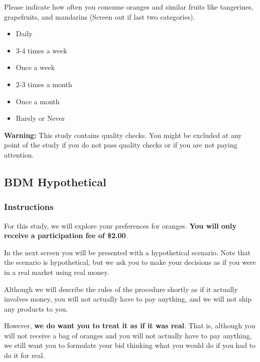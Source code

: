 \documentclass[12pt]{article}
\begin{document}
 Please indicate how often you consume oranges and similar fruits like tangerines, grapefruits, and mandarins (Screen out if last two categories).  

\begin{itemize}
    \item Daily
    \item 3-4 times a week
    \item Once a week
    \item 2-3 times a month
    \item Once a month
    \item Rarely or Never
\end{itemize}

\vspace{1cm} %

\textbf{Warning:} This study contains quality checks. You might be excluded at any point of the study if you do not pass quality checks or if you are not paying attention.


\clearpage


\subsection{BDM Hypothetical}

\subsubsection*{Instructions }


For this study, we will explore your preferences for oranges. \textbf{You will only receive a participation fee of \$2.00}. \par

 In the next screen you will be presented with a hypothetical scenario. Note that the scenario is hypothetical, but we ask you to make your decisions as if you were in a real market using real money. \par

Although we will describe the rules of the procedure shortly as if it actually involves money, you will not actually have to pay anything, and we will not ship any products to you. \par

However,\textbf{ we do want you to treat it as if it was real}. That is, although you will not receive a bag of oranges and you will not actually have to pay anything, we still want you to formulate your bid thinking what you would do if you had to do it for real. \par
\end{document}
